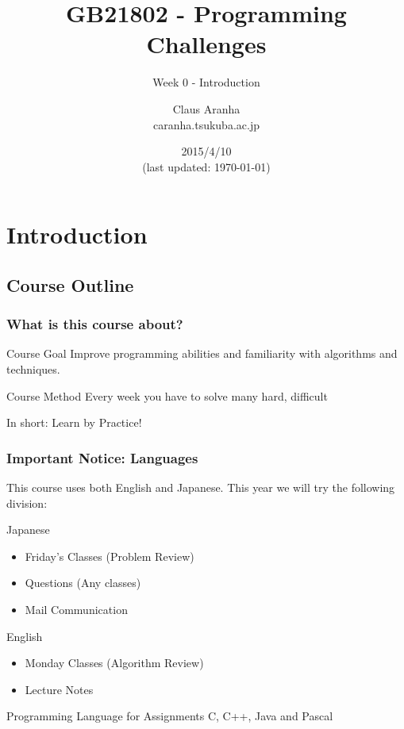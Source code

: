 \documentclass{beamer}
\title[GB21802]{GB21802 - Programming Challenges}
\subtitle[]{Week 0 - Introduction}
\author[Claus Aranha]{Claus Aranha\\{\footnotesize caranha\@@cs.tsukuba.ac.jp}}
\institute{Department of Computer Science}
\date{2015/4/10\\{\smaller(last updated: \today)}}
\begin{document}
\section{Introduction}
\subsection{Course Outline}

\begin{frame}
\maketitle
\end{frame}

\begin{frame}
  \frametitle{What is this course about?}
  \begin{block}{Course Goal}
    Improve programming abilities and familiarity with algorithms and techniques.
  \end{block}
  \begin{block}{Course Method}
    Every week you have to solve many hard, difficult     
  \end{block}
  
  \bigskip
  
   In short: Learn by Practice!
\end{frame}

\begin{frame}
  \frametitle{Important Notice: Languages}
  
  This course uses both English and Japanese. This year we will try the following division:
      
  \begin{alertblock}{Japanese}
  \begin{itemize}
    \item Friday's Classes (Problem Review)
    \item Questions (Any classes)
    \item Mail Communication
  \end{itemize}
  \end{alertblock}
  
  \begin{block}{English}
  \begin{itemize}
    \item Monday Classes (Algorithm Review)
    \item Lecture Notes
  \end{itemize}
  \end{block}
  
  \begin{exampleblock}{Programming Language for Assignments}
    C, C++, Java and Pascal
  \end{exampleblock}
\end{frame}
\end{document}
